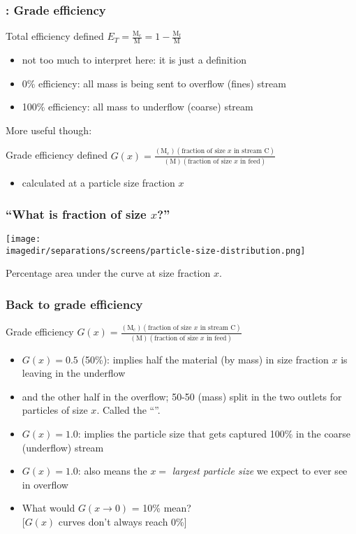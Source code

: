 \begin{frame}\frametitle{{\color{myOrange}{Concept}}: Grade efficiency}
	\begin{exampleblock}{Total efficiency defined}
		$E_T = \displaystyle \frac{\text{M}_\text{c}}{\text{M}} = 1 - \displaystyle \frac{\text{M}_\text{f}}{\text{M}}$
	\end{exampleblock}	
	\begin{itemize}
		\item	not too much to interpret here: it is just a definition
		\item	0\% efficiency: all mass is being sent to overflow (fines) stream
		\item	100\% efficiency: all mass to underflow (coarse) stream
	\end{itemize}
	\vspace{12pt}
	More useful though:
	\begin{exampleblock}{Grade efficiency defined}
		$G(x) = \displaystyle \frac{(\text{M}_\text{c})(\text{fraction of size $x$ in stream C})}{(\text{M})(\text{fraction of size $x$ in feed})}$
	\end{exampleblock}
	\begin{itemize}
		\item	calculated at a particle size fraction $x$
	\end{itemize}	
\end{frame}

\begin{frame}\frametitle{``What is fraction of size $x$?''}	
	\begin{center}
		\texttt{[image: \\imagedir/separations/screens/particle-size-distribution.png]}
	\end{center}
	Percentage area under the curve at size fraction $x$.
\end{frame}

\begin{frame}\frametitle{Back to grade efficiency}
	\begin{exampleblock}{Grade efficiency}
		$G(x) = \displaystyle \frac{(\text{M}_\text{c})(\text{fraction of size $x$ in stream C})}{(\text{M})(\text{fraction of size $x$ in feed})}$
	\end{exampleblock}
	\begin{itemize}
		\item	$G(x) = 0.5$ (50\%): implies half the material (by mass) in size fraction $x$ is leaving in the underflow
		\item	and the other half in the overflow; 50-50 (mass) split in the two outlets for particles of size $x$. Called the ``{\color{myRed}{cut size}}''.
		\item	$G(x) = 1.0$: implies the particle size that gets captured 100\%  in the coarse (underflow) stream
		\item	$G(x) = 1.0$: also means the $x=$ \emph{largest particle size} we expect to ever see in overflow
		\item	\adv What would $G(x \rightarrow 0)$ = 10\% mean? \\{\scriptsize [$G(x)$ curves don't always reach 0\%]}
	\end{itemize}	
\end{frame}

